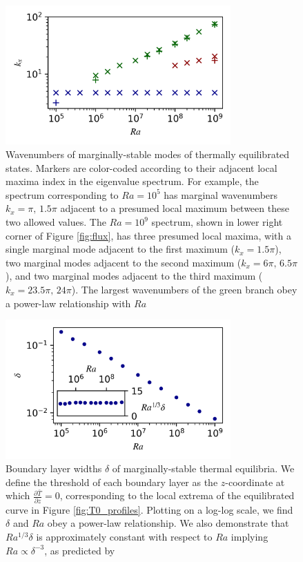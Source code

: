 \documentclass[reprint,amsmath,amssymb,aps]{revtex4-1}
\begin{document}
\begin{figure}[h]
    \centering
    \includegraphics[width=3.4in]{kx_m_ra1.png}
    \caption{Wavenumbers of marginally-stable modes of thermally equilibrated states. Markers are color-coded according to their adjacent local maxima index in the eigenvalue spectrum. For example, the spectrum corresponding to $Ra = 10^5$ has marginal wavenumbers $k_x = \pi, \, 1.5\pi$ adjacent to a presumed local maximum between these two allowed values. The $Ra = 10^9$ spectrum, shown in lower right corner of Figure \ref{fig:flux}, has three presumed local maxima, with a single marginal mode adjacent to the first maximum ($k_x = 1.5\pi$), two marginal modes adjacent to the second maximum ($k_x = 6\pi, \, 6.5\pi$), and two marginal modes adjacent to the third maximum ($k_x = 23.5\pi, \, 24\pi$). The largest wavenumbers of the green branch obey a power-law relationship with $Ra$}
    \label{fig:kx_marginals}
\end{figure}
\begin{figure}[h]
    \centering
    \includegraphics[width=3.4in]{del_ra.PNG}
    \caption{Boundary layer widths $\delta$ of marginally-stable thermal equilibria. We define the threshold of each boundary layer as the $z$-coordinate at which $\frac{\partial \bar{T}}{\partial z} = 0$, corresponding to the local extrema of the equilibrated curve in Figure \ref{fig:T0_profiles}. Plotting on a log-log scale, we find $\delta$ and $Ra$ obey a power-law relationship. We also demonstrate that $Ra^{1/3}\delta$ is approximately constant with respect to $Ra$ implying $Ra \propto  \delta^{-3}$, as predicted by \cite{Malkus}}
    \label{fig:bl_ra}
\end{figure}
\end{document}
